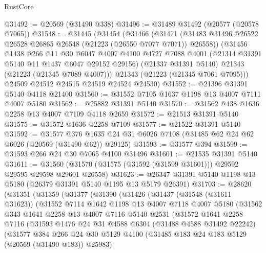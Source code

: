 \begin{lexlean}{RustCore}
\begin{coremodule}
@31492 := @20569 (@31490 @338)
@31496 := @31489 @31492 (@20577 (@20578 @7065))
@31548 := @31445
    (@31454
      (@31466
        (@31471 (@31483 @31496 @26522 @26528 @26865 @26548 (@21223 (@26550 @7077 @7071)) @26558))
        (@31456
          @1438
          @266
          @11
          @30
          @6047
          @4007
          @4100
          @4727
          @7088
          @4001
          (@21314 @31391 @5140 @11 @1437 @6047 @29152 @29156)
          (@21337 @31391 @5140)
          @21343
          (@21223 (@21345 @7089 @4007)))
        @21343
        (@21223 (@21345 @7061 @7095)))
      @24509
      @24512
      @24515
      @24519
      @24524
      @24530)
@31552 := @21396 @31391 @5140 @4118 @21400
@31560 := @31552 @7105 @1637 @1198 @13 @4007 @7111 @4007 @5180
@31562 := @25882 @31391 @5140
@31570 := @31562 @438 @1636 @2258 @13 @4007 @7109 @4118 @2659
@31572 := @21513 @31391 @5140
@31575 := @31572 @1636 @2258 @7109
@31577 := @21522 @31391 @5140
@31592 := @31577
    @376
    @1635
    @24
    @31
    @6026
    @7108
    (@31485 @62 @24 @62 @6026 (@20569 (@31490 @62)) @29125)
@31593 := @31577 @394
@31599 := @31593 @266 @24 @30 @7065 @4100 @31496
@31601 := @21535 @31391 @5140
@31611 := @31560 (@31570 (@31575 (@31592 (@31599 @31601))) @29592 @29595 @29598 @29601 @26558)
@31623 := @26347 @31391 @5140 @1198 @13 @5180 (@26379 @31391 @5140 @1195 @13 @5179 @26391)
@31703 := @28620
    (@31351
      (@31359
        (@31377
          (@31390
            (@31426
              (@31437
                (@31548 (@31611 @31623))
                (@31552
                  @7114
                  @1642
                  @1198
                  @13
                  @4007
                  @7118
                  @4007
                  @5180
                  (@31562
                    @343
                    @1641
                    @2258
                    @13
                    @4007
                    @7116
                    @5140
                    @2531
                    (@31572
                      @1641
                      @2258
                      @7116
                      (@31593
                        @1476
                        @24
                        @31
                        @4588
                        @6304
                        (@31488 @4588 @31492 @22242)
                        (@31577
                          @384
                          @266
                          @24
                          @30
                          @5129
                          @4100
                          (@31485 @183 @24 @183 @5129 (@20569 (@31490 @183)) @25983)

\end{coremodule}
\end{lexlean}

